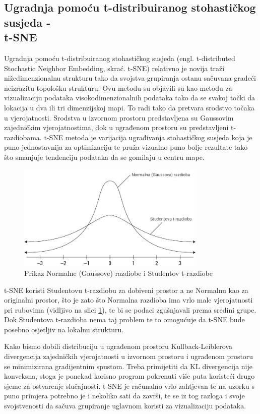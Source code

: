 \documentclass[times, utf8, diplomski]{fer}
\begin{document}
\subsection{Ugradnja pomoću t-distribuiranog stohastičkog susjeda -\\ t-SNE}
Ugradnja pomoću t-distribuiranog stohastičkog susjeda (engl. t-distributed Stochastic Neighbor Embedding, skrać. t-SNE) relativno je novija traži nižedimenzionalnu strukturu tako da svojstva grupiranja ostanu sačuvana gradeći neizrazitu  topološku strukturu. Ovu metodu su objavili su \cite{maaten2008visualizing} kao metodu za vizualizaciju podataka visokodimenzionalnih podataka tako da se svakoj točki da lokacija u dva ili tri dimenzijskoj mapi. To radi tako da pretvara srodstvo točaka u vjerojatnosti. Srodstva u izvornom prostoru predstavljena su Gaussovim zajedničkim vjerojatnostima, dok u ugrađenom prostoru su predstavljeni t-razdiobama. t-SNE metoda je varijacija ugrađivanja stohastičkog susjeda  koja je puno jednostavnija za optimizaciju te pruža vizualno puno bolje rezultate tako što smanjuje tendenciju podataka da se gomilaju u centru mape.
\begin{figure}[htb]
    \centering
    \includegraphics[width=9cm]{resources/images/reduction/tsne.jpg}
    \caption{Prikaz Normalne (Gaussove) razdiobe i Studentov t-razdiobe}
    \label{fig:tsne}
\end{figure}

t-SNE koristi Studentovu t-razdiobu za dobiveni prostor a ne Normalnu kao za originalni prostor, što je zato što Normalna razdioba ima vrlo male vjerojatnosti pri rubovima (vidljivo na slici \ref{fig:tsne}), te bi se podaci zgušnjavali prema sredini grupe. Dok Studentova t-razdioba nema taj problem te to omogućuje da t-SNE bude posebno osjetljiv na lokalnu strukturu.

Kako bismo dobili distribuciju u ugrađenom prostoru Kullback-Leiblerova divergencija zajedničkih vjerojatnosti u izvornom prostoru i ugrađenom prostoru se minimizirana gradijentnim spustom. Treba primijetiti da KL divergencija nije konveksna, stoga je ponekad korisno program pokrenuti više puta koristeći drugo sjeme za ostvarenje slučajnosti. t-SNE je računalno vrlo zahtjevan te na uzorku s puno primjera potrebno je i nekoliko sati da završi, te se iz tog razloga i svoje svojstvenosti da sačuva grupiranje uglavnom koristi za vizualizaciju podataka.
\end{document}
